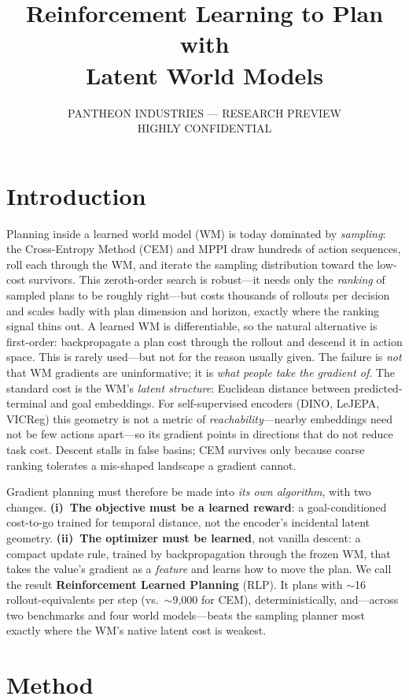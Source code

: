 \documentclass{article} %
\title{Reinforcement Learning to Plan with\\ Latent World Models}
\author{{PANTHEON INDUSTRIES --- RESEARCH PREVIEW} \\
{HIGHLY CONFIDENTIAL}\\
{\texttt{}}}
\theoremstyle{plain}
\theoremstyle{definition}
\begin{document}
\maketitle

\section{Introduction}

Planning inside a learned world model (WM) is today dominated by \emph{sampling}:
the Cross-Entropy Method (CEM) and MPPI draw hundreds of action sequences, roll
each through the WM, and iterate the sampling distribution toward the low-cost
survivors. This zeroth-order search is robust---it needs only the \emph{ranking}
of sampled plans to be roughly right---but costs thousands of rollouts per
decision and scales badly with plan dimension and horizon, exactly where the
ranking signal thins out. A learned WM is differentiable, so the natural
alternative is first-order: backpropagate a plan cost through the rollout and
descend it in action space. This is rarely used---but not for the reason usually
given. The failure is \emph{not} that WM gradients are uninformative; it is
\emph{what people take the gradient of}. The standard cost is the WM's
\emph{latent structure}: Euclidean distance between predicted-terminal and goal
embeddings. For self-supervised encoders (DINO, LeJEPA, VICReg) this geometry is
not a metric of \emph{reachability}---nearby embeddings need not be few actions
apart---so its gradient points in directions that do not reduce task cost.
Descent stalls in false basins; CEM survives only because coarse ranking
tolerates a mis-shaped landscape a gradient cannot.

Gradient planning must therefore be made into \emph{its own algorithm}, with two
changes. \textbf{(i)~The objective must be a learned reward}: a goal-conditioned
cost-to-go trained for temporal distance, not the encoder's incidental latent
geometry. \textbf{(ii)~The optimizer must be learned}, not vanilla descent: a
compact update rule, trained by backpropagation through the frozen WM, that takes
the value's gradient as a \emph{feature} and learns how to move the plan. We call
the result \textbf{Reinforcement Learned Planning} (RLP). It plans with
$\sim$16 rollout-equivalents per step (vs.\ $\sim$9{,}000 for CEM),
deterministically, and---across two benchmarks and four world models---beats the
sampling planner most exactly where the WM's native latent cost is weakest.

\section{Method}
\end{document}
